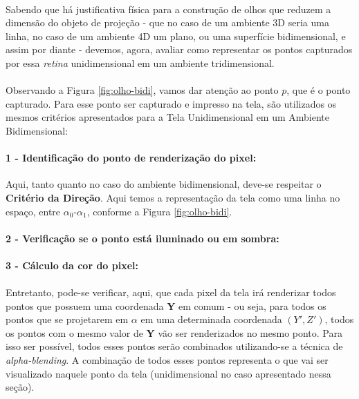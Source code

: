 \documentclass{article}
\begin{document}
	\paragraph{}
	Sabendo que há justificativa física para a construção de olhos que reduzem a dimensão do objeto de projeção - que no caso de um ambiente 3D seria uma linha, no caso de um ambiente 4D um plano, ou uma superfície bidimensional, e assim por diante - devemos, agora, avaliar como representar os pontos capturados por essa \textit{retina} unidimensional em um ambiente tridimensional.
	
	\paragraph{}
	Observando a Figura \ref{fig:olho-bidi}, vamos dar atenção ao ponto $p$, que é o ponto capturado. Para esse ponto ser capturado e impresso na tela, são utilizados os mesmos critérios apresentados para a Tela Unidimensional em um Ambiente Bidimensional:
	
	\paragraph{1 - Identificação do ponto de renderização do pixel:}
	Aqui, tanto quanto no caso do ambiente bidimensional, deve-se respeitar o \textbf{Critério da Direção}. Aqui temos a representação da tela como uma linha no espaço, entre $\alpha_0$-$\alpha_1$, conforme a Figura \ref{fig:olho-bidi}.
	
	\paragraph{2 - Verificação se o ponto está iluminado ou em sombra:}
	\paragraph{3 - Cálculo da cor do pixel: }
	
	\paragraph{}
	Entretanto, pode-se verificar, aqui, que cada pixel da tela irá renderizar todos pontos que possuem uma coordenada \textbf{Y} em comum - ou seja, para todos os pontos que se projetarem em $\alpha$ em uma determinada coordenada $(Y',Z')$, todos os pontos com o mesmo valor de \textbf{Y} vão ser renderizados no mesmo ponto. Para isso ser possível, todos esses pontos serão combinados utilizando-se a técnica de \textit{alpha-blending}. A combinação de todos esses pontos representa o que vai ser visualizado naquele ponto da tela (unidimensional no caso apresentado nessa seção).
	
\end{document}
